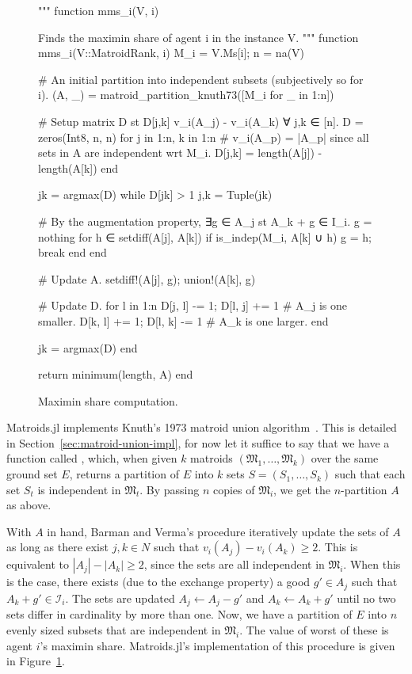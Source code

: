 \begin{figure}
  \begin{jllisting}
"""
  function mms_i(V, i)

Finds the maximin share of agent i in the instance V.
"""
function mms_i(V::MatroidRank, i)
  M_i = V.Ms[i]; n = na(V)

  # An initial partition into independent subsets (subjectively so for i).
  (A, _) = matroid_partition_knuth73([M_i for _ in 1:n])

  # Setup matrix D st D[j,k] v_i(A_j) - v_i(A_k) ∀ j,k ∈ [n].
  D = zeros(Int8, n, n)
  for j in 1:n, k in 1:n
      # v_i(A_p) = |A_p| since all sets in A are independent wrt M_i.
      D[j,k] = length(A[j]) - length(A[k])
  end

  jk = argmax(D)
  while D[jk] > 1
      j,k = Tuple(jk)

      # By the augmentation property, ∃g ∈ A_j st A_k + g ∈ I_i.
      g = nothing
      for h ∈ setdiff(A[j], A[k]) 
          if is_indep(M_i, A[k] ∪ h)
              g = h; break
          end 
      end

      # Update A.
      setdiff!(A[j], g); union!(A[k], g)

      # Update D.
      for l in 1:n
          D[j, l] -= 1; D[l, j] += 1 # A_j is one smaller.
          D[k, l] += 1; D[l, k] -= 1 # A_k is one larger.
      end

      jk = argmax(D)
  end
  
  return minimum(length, A)
end
  \end{jllisting}
  \caption{Maximin share computation.}
  \label{code:mms_i}
\end{figure}

Matroids.jl implements Knuth's 1973 matroid union algorithm~\cite{knuth1973matroidpartitioning}. This is detailed in Section~\ref{sec:matroid-union-impl}, for now let it suffice to say that we have a function called , which, when given $k$ matroids $(\mathfrak{M}_1,\dots,\mathfrak{M}_k)$ over the same ground set $E$, returns a partition of $E$ into $k$ sets $S = (S_1, \dots, S_k)$ such that each set $S_t$ is independent in $\mathfrak{M}_t$. By passing $n$ copies of $\mathfrak{M}_i$, we get the $n$-partition $A$ as above.

With $A$ in hand, Barman and Verma's procedure iteratively update the sets of $A$ as long as there exist $j, k \in N$ such that $v_i(A_j) - v_i(A_k) \geq 2$. This is equivalent to $|A_j| - |A_k| \geq 2$, since the sets are all independent in $\mathfrak{M}_i$. When this is the case, there exists (due to the exchange property) a good $g'\in A_j$ such that $A_k + g' \in \mathcal{I}_i$. The sets are updated $A_j \leftarrow A_j - g'$ and $A_k \leftarrow A_k + g'$ until no two sets differ in cardinality by more than one. Now, we have a partition of $E$ into $n$ evenly sized subsets that are independent in $\mathfrak{M}_i$. The value of worst of these is agent $i$'s maximin share. Matroids.jl's implementation of this procedure is given in Figure~\ref{code:mms_i}.




